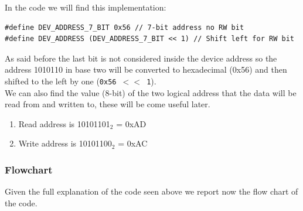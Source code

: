 \documentclass[../main.tex]{subfiles}
\begin{document}
In the code we will find this implementation:\\

\begin{lstlisting}
#define DEV_ADDRESS_7_BIT 0x56 // 7-bit address no RW bit
#define DEV_ADDRESS (DEV_ADDRESS_7_BIT << 1) // Shift left for RW bit
\end{lstlisting}

\vspace{0.5cm}

As said before the last bit is not considered inside the device address so the address 1010110 in base two will be converted to hexadecimal (0x56) and then shifted to the left by one (\texttt{0x56 $<<$ 1}).\\

We can also find the value (8-bit) of the two logical address that the data will be read from and written to, these will be come useful later.

\begin{enumerate}[label=\textbf{-}]
	\item Read address is 10101101$_2$ =  0xAD
	\item Write address is 10101100$_2$ = 0xAC
\end{enumerate}


\subsubsection*{Flowchart}

Given the full explanation of the code seen above we report now the flow chart of the code.\\
\end{document}
